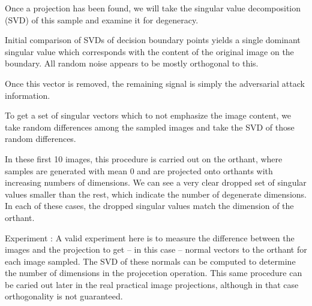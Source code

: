 Once a projection has been found, we will take the singular value decomposition (SVD) of this sample and examine it for degeneracy. 


Initial comparison of SVDs of decision boundary points yields a single dominant singular value which corresponds with the content of the original image on the boundary. All random noise appears to be mostly orthogonal to this. 

Once this vector is removed, the remaining signal is simply the adversarial attack information. 

To get a set of singular vectors which to not emphasize the image content, we take random differences among the sampled images and take the SVD of those random differences. 

In these first 10 images, this procedure is carried out on the orthant, where samples are generated with mean 0 and are projected onto orthants with increasing numbers of dimensions. We can see a very clear dropped set of singular values smaller than the rest, which indicate the number of degenerate dimensions. In each of these cases, the dropped singular values match the dimension of the orthant. 

Experiment : A valid experiment here is to measure the difference between the images and the projection to get -- in this case -- normal vectors to the orthant for each image sampled. The SVD of these normals can be computed to determine the number of dimensions in the projecetion operation. This same procedure can be caried out later in the real practical image projections, although in that case orthogonality is not guaranteed. 

